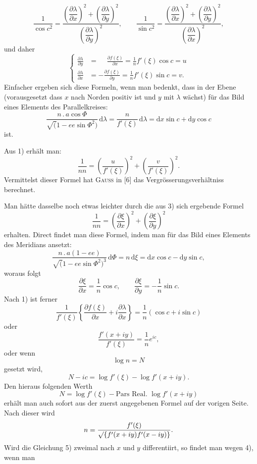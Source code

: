 {\small
\[
\frac1{\cos c^2}=\frac{\left(\dfrac{\partial\lambda}{\partial x}\right)^2
 +\left(\dfrac{\partial\lambda}{\partial y}\right)^2}
 {\left(\dfrac{\partial\lambda}{\partial y}\right)^2},\qquad
\frac1{\sin c^2}=\frac{\left(\dfrac{\partial\lambda}{\partial x}\right)^2
 +\left(\dfrac{\partial\lambda}{\partial y}\right)^2}
 {\left(\dfrac{\partial\lambda}{\partial x}\right)^2},
\]
\noindent und daher
\begin{equation*}
\left\{\begin{aligned}
\frac{\partial\lambda}{\partial y}
 &=\phantom{-}\frac{\partial f(\xi)}{\partial x}=\frac1n f'(\xi)\cos c=u\\
\frac{\partial\lambda}{\partial x}
 &=-\frac{\partial f(\xi)}{\partial y}=\frac1n f'(\xi)\sin c=v.
\end{aligned}\right.
\tag*{1)}
\end{equation*}
Einfacher ergeben sich diese Formeln, wenn man bedenkt, dass in der Ebene (vorausgesetzt
dass \(x\) nach Norden positiv ist und \(y\) mit \(\lambda\) wächst) für das Bild eines
Elements des Parallelkreises:
\begin{equation*}
\frac{n\,.\,a\cos\Phi}{\surd(1-ee\sin\Phi^2)}\,\mathrm d\lambda
=\frac n{f'(\xi)}\,\mathrm d\lambda=\mathrm dx\sin c+\mathrm dy\cos c
\tag*{2)}
\end{equation*}
\noindent ist.

Aus 1) erhält man:
\begin{equation*}
\frac1{nn}=\left(\frac u{f'(\xi)}\right)^2+\left(\frac v{f'(\xi)}\right)^2.
\tag*{3)}
\end{equation*}
Vermittelst dieser Formel hat \textsc{Gauss} in [6] das Vergrösserungsverhältniss berechnet.

Man hätte dasselbe noch etwas leichter durch die aus 3) sich ergebende Formel
\begin{equation*}
\frac1{nn}=\left(\frac{\partial\xi}{\partial x}\right)^2+
\left(\frac{\partial\xi}{\partial y}\right)^2
\tag*{4)}
\end{equation*}
\noindent erhalten. Direct findet man diese Formel, indem man für das Bild eines Elements
des Meridians ansetzt:
\[
\frac{n\,.\,a(1-ee)}{\surd(1-ee\sin\Phi^2)^3}\,\mathrm d\Phi
=n\,\mathrm d\xi=\mathrm dx\cos c-\mathrm dy\sin c,
\]
\noindent woraus folgt
\[
\frac{\partial\xi}{\partial x}=\frac1n\cos c,\qquad
\frac{\partial\xi}{\partial y}=-\frac1n\sin c.
\]
Nach 1) ist ferner
\[
\frac1{f'(\xi)}\left\{\frac{\partial f(\xi)}{\partial x}
+i\frac{\partial\lambda}{\partial x}\right\}
=\frac1n(\cos c+i\sin c)
\]
\noindent oder
\[
\frac{f'(x+iy)}{f'(\xi)}=\frac1n e^{ic},
\]
\noindent oder wenn
\[
\log n=N
\]
\noindent gesetzt wird,
\begin{equation*}
N-ic=\log f'(\xi)-\log f'(x+iy).
\tag*{5)}
\end{equation*}
Den hieraus folgenden Werth
\[
N=\log f'(\xi)-\text{Pars Real. }\log f'(x+iy)
\]
\noindent erhält man auch sofort aus der zuerst angegebenen Formel auf der vorigen Seite.
Nach dieser wird
\[
n=\frac{f'(\xi)}{\surd\{f'(x+iy)f'(x-iy)\}}.
\]
Wird die Gleichung 5) zweimal nach \(x\) und \(y\) differentiirt, so findet man wegen 4),
wenn man
\par}

